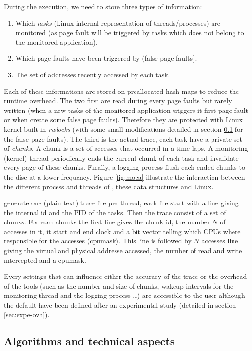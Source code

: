During the execution, we need to store three types of information:
\begin{enumerate}
    \item Which \emph{tasks} (Linux internal representation of threads/processes) are
monitored (as page fault will be triggered by tasks which does not belong to
the monitored application).
    \item Which page faults have been triggered by \Moca (false page faults).
    \item The set of addresses recently accessed by each task.
\end{enumerate}
Each of these informations are stored on preallocated hash maps to reduce the
runtime overhead.
The two first are read during every page faults but rarely
written (when a new tasks of the monitored application triggers it first page
fault or when \Moca create some false page faults). Therefore they are
protected with Linux kernel built-in \emph{rwlocks} (with some small
modifications detailed in section \ref{sec:design-tech} for the false page
faults). The third is the actual trace, each task have a private set of
\emph{chunks}. A chunk is a set of accesses that occurred in a time laps. A
monitoring (kernel) thread periodically ends the current chunk of each task
and invalidate every page of these chunks. Finally, a logging process flush
each ended chunks to the disc at a lower frequency.
Figure \ref{fig:moca} illustrate the interaction between the different process
and threads of \Moca, these data structures and Linux.

\Moca generate one (plain text) trace file per thread, each file start with a
line giving the internal id and the PID of the tasks. Then the trace consist
of a set of chunks. For each chunks the first line gives the chunk id, the
number $N$ of accesses in it, it start and end clock and a bit vector telling
which CPUs where responsible for the accesses (cpumask). This line is followed
by $N$ accesses line giving the virtual and physical addresse accessed, the
number of read and write intercepted and a cpumask.

Every settings that can influence either the accuracy of the trace or the
overhead of the tools (such as the number and size of chunks, wakeup intervals
for the monitoring thread and the logging process \ldots) are accessible to the
user although the default have been defined after an experimental study
(detailed in section \ref{sec:expe-ovh}).

\subsection{Algorithms and technical aspects}
\label{sec:design-tech}

